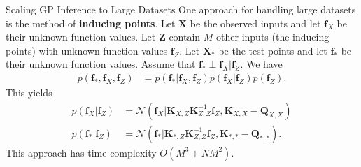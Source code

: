 \documentclass{beamer}
\begin{document}
\begin{frame}{Scaling GP Inference to Large Datasets}
    One approach for handling large datasets is the method of \textbf{inducing points}. Let $\boldsymbol{X}$ be the observed inputs and let $\boldsymbol{f}_X$ be their unknown function values. Let $\boldsymbol{Z}$ contain $M$ other inputs (the inducing points) with unknown function values $\boldsymbol{f}_Z$. Let $\boldsymbol{X}_*$ be the test points and let $\boldsymbol{f}_*$ be their unknown function values. Assume that $\boldsymbol{f}_* \perp \boldsymbol{f}_X | \boldsymbol{f}_Z$. We have
    \begin{align*}
        p(\boldsymbol{f}_*, \boldsymbol{f}_X, \boldsymbol{f}_Z) &= p(\boldsymbol{f}_* | \boldsymbol{f}_X, \boldsymbol{f}_Z)p(\boldsymbol{f}_X | \boldsymbol{f}_Z)p(\boldsymbol{f}_Z).
    \end{align*}
    This yields
    \begin{align*}
        p(\boldsymbol{f}_X | \boldsymbol{f}_Z) &= \mathcal{N}(\boldsymbol{f}_X | \boldsymbol{K}_{X, Z}\boldsymbol{K}_{Z, Z}^{-1}\boldsymbol{f}_Z, \boldsymbol{K}_{X, X} - \boldsymbol{Q}_{X, X}) \\
        p(\boldsymbol{f}_* | \boldsymbol{f}_Z) &= \mathcal{N}(\boldsymbol{f}_* | \boldsymbol{K}_{*, Z}\boldsymbol{K}_{Z, Z}^{-1}\boldsymbol{f}_Z, \boldsymbol{K}_{*, *} - \boldsymbol{Q}_{*, *}).
    \end{align*}
    This approach has time complexity $O(M^3 + N M^2)$.
\end{frame}
\end{document}
